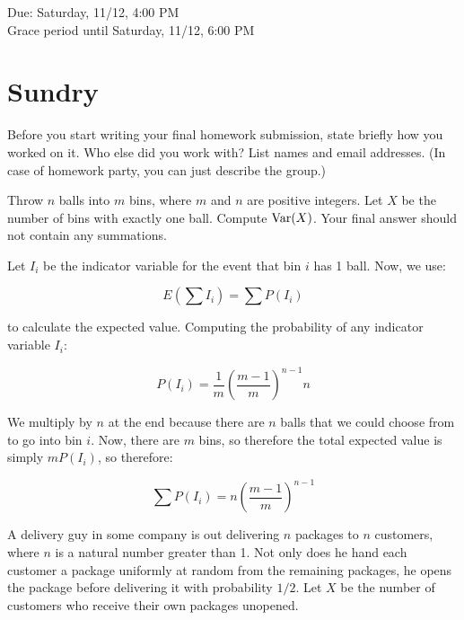 \documentclass[11pt]{article}
\begin{document}
\maketitle
\fontsize{12}{15}\selectfont

\begin{center}
    Due: Saturday, 11/12, 4:00 PM \\
    Grace period until Saturday, 11/12, 6:00 PM \\
\end{center}

\section*{Sundry}
Before you start writing your final homework submission, state briefly how you worked on it.  Who else did you work with?  List names and email addresses.  (In case of homework party, you can just describe the group.)

\vspace{15pt}


Throw $n$ balls into $m$ bins, where $m$ and $n$ are positive integers. Let $X$ be the number of bins with exactly one ball. Compute $\operatorname{Var} (X)$. Your final answer should not contain any summations.


\begin{solution}
    Let $I_i$ be the indicator variable for the event that bin $i$ has 1 ball. Now, we use:

    \[ E\left(\sum I_i\right) = \sum P(I_i)\]

    to calculate the expected value. Computing the probability of any indicator variable $I_i$:

    \[ P(I_i) = \frac{1}{m} \left(\frac{m-1}{m}\right)^{n-1} n\]

    We multiply by $n$ at the end because there are $n$ balls that we could choose from to go into bin $i$. Now, there are $m$ bins, so therefore the total expected value is simply $mP(I_i)$, so therefore: 

    \[ \sum P(I_i) = n \left(\frac{m-1}{m}\right)^{n-1}\]
\end{solution}
\pagebreak
{}

A delivery guy in some company is out delivering $n$ packages to $n$ customers, where $n$ is a natural number greater than 1.
Not only does he hand each customer a package uniformly at random from the remaining packages, he opens the package before delivering it with probability $1/2$.
Let $X$ be the number of customers who receive their own packages unopened. 
\end{document}
